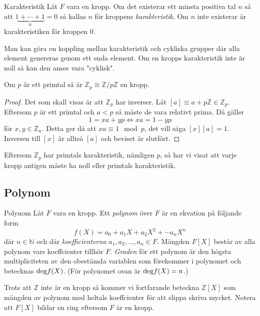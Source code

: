 \documentclass{article}
\newcommand{\grad}[0]{\textnormal{deg}}
\theoremstyle{definition}
\begin{document}
\begin{mydef}{Karakteristik}{}
  Låt $F$ vara en kropp. Om det existerar ett minsta positiva tal $n$ så att $\underbrace{1 + \cdots + 1}_{n} = 0$ så kallas $n$ för kroppens \textit{karakteristik}.
  Om $n$ inte existerar är karakteristiken för kroppen $0.$
\end{mydef}
Man kan göra en koppling mellan karakteristik och cykliska grupper där alla element genereras genom ett enda element. Om en kropps karakteristik inte är noll
så kan den anses vara "cyklisk". 

\begin{mytheo}{}{}
  Om $p$ är ett primtal så är $\mathbb{Z}_p \cong \mathbb{Z}/p\mathbb{Z}$ en kropp.
\end{mytheo}

\begin{proof}
  Det som skall visas är att $\mathbb{Z}_p$ har inverser. Låt $[a] \equiv a + p \mathbb{Z} \in \mathbb{Z}_p$. Eftersom $p$ är ett primtal och 
  $a < p$ så måste de vara relativt prima. Då gäller 
  \[ 1 = xa + yp  \iff xa = 1 - yp\]
  för $x, y \in \mathbb{Z}_n$. Detta ger då att $xa \equiv 1 \mod p$, det vill säga $[x][a] = 1$. Inversen till 
  $[x]$ är alltså $[a]$ och beviset är slutfört. 
\end{proof}
Eftersom $\mathbb{Z}_p$ har primtals karakteristik, nämligen $p$, så har vi visat att varje kropp antigen måste ha noll eller primtals karakteristik. 


\subsection{Polynom}
\begin{mydef}{Polynom}{}
  Låt $F$ vara en kropp. Ett \textit{polynom} över $F$ är en ekvation på följande form
  \[f(X) = a_0 + a_1X + a_2X^2 + \cdots a_nX^n\]
  där $n \in \mathbb{N}$ och där \textit{koefficienterna} $a_1, a_2, \ldots, a_n \in F$. 
  Mängden $F[X]$ består av alla polynom vars koeffcienter tillhör $F$. \textit{Graden} för ett polynom är den högsta multipliciteten av den obestämda variablen som 
  förekommer i polynomet och betecknas $\grad f(X)$. (För polynomet ovan är $\grad f(X) = n$.)
\end{mydef}
Trots att $\mathbb{Z}$ inte är en kropp så kommer vi fortfarande beteckna $\mathbb{Z}[X]$ som mängden av polynom med heltals koeffcienter
för att slippa skriva mycket. Notera att $F[X]$ bildar en ring eftersom $F$ är en kropp.
\end{document}
